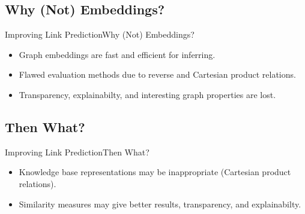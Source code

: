 \documentclass[10pt, aspectratio = 1610, hide notes]{beamer}
\begin{document}
\subsection{Why (Not) Embeddings?}
\begin{frame}{Improving Link Prediction}{Why (Not) Embeddings?}
  \begin{itemize}[<+->]
    \item Graph embeddings are fast and efficient for inferring.
    \item Flawed evaluation methods due to reverse and Cartesian product relations.
    \item Transparency, explainabilty, and interesting graph properties are lost.
  \end{itemize}
\end{frame}

\subsection{Then What?}
\begin{frame}{Improving Link Prediction}{Then What?}
  \begin{itemize}[<+->]
    \item Knowledge base representations may be inappropriate (Cartesian product relations).
      \begin{figure}
        \centering
        
      \end{figure}
    \item Similarity measures may give better results, transparency, and explainabilty.
  \end{itemize}
\end{frame}

{\aauwavesbg%
\begin{frame}
\end{frame}}
\end{document}

